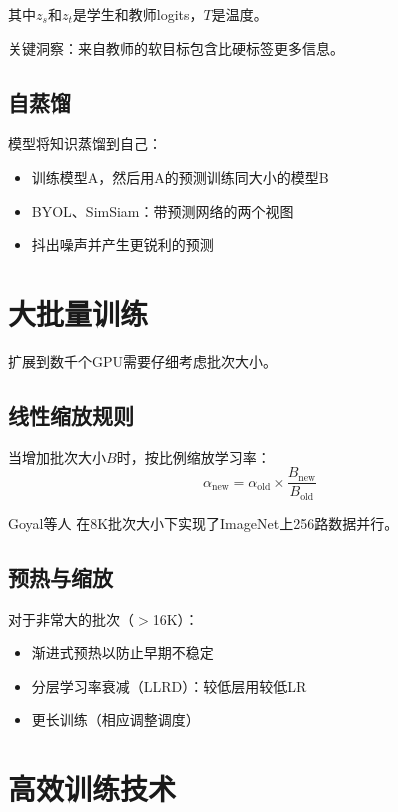 其中$z_s$和$z_t$是学生和教师logits，$T$是温度。

关键洞察：来自教师的软目标包含比硬标签更多信息。

\subsection{自蒸馏}

模型将知识蒸馏到自己：
\begin{itemize}
    \item 训练模型A，然后用A的预测训练同大小的模型B
    \item BYOL、SimSiam：带预测网络的两个视图
    \item 抖出噪声并产生更锐利的预测
\end{itemize}

\section{大批量训练}

扩展到数千个GPU需要仔细考虑批次大小。

\subsection{线性缩放规则}

当增加批次大小$B$时，按比例缩放学习率：
\begin{equation}
\alpha_{\text{new}} = \alpha_{\text{old}} \times \frac{B_{\text{new}}}{B_{\text{old}}}
\end{equation}

Goyal等人 \cite{goyal2017accurate}在8K批次大小下实现了ImageNet上256路数据并行。

\subsection{预热与缩放}

对于非常大的批次（$>$16K）：
\begin{itemize}
    \item 渐进式预热以防止早期不稳定
    \item 分层学习率衰减（LLRD）：较低层用较低LR
    \item 更长训练（相应调整调度）
\end{itemize}

\section{高效训练技术}

